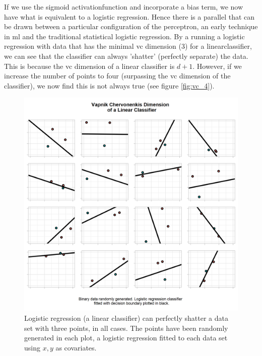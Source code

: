 If we use the sigmoid \gls{activationfunction} and incorporate a bias term, we now have what is equivalent to a logistic regression. Hence there is a parallel that can be drawn between a particular configuration of the perceptron, an early technique in \gls{ml} and the traditional statistical logistic regression. By a running a logistic regression with data that has the minimal \gls{vc} dimension (3) for a \gls{linearclassifier}, we can see that the classifier can always 'shatter' (perfectly separate) the data. This is because the \gls{vc} dimension of a linear classifier is $d+1$. However, if we increase the number of points to four (surpassing the \gls{vc} dimension of the classifier), we now find this is not always true (see figure \ref{fig:vc_4}).

\begin{figure}[H]
    \centering
    \includegraphics[width=120mm]{figs/vc_3.png}
    \caption[\gls{vc} dimension of a linear classifier - the data is shattered.]{Logistic regression (a linear classifier) can perfectly shatter a data set with three points, in all cases. The points have been randomly generated in each plot, a logistic regression fitted to each data set using $x, y$ as covariates.}
    \label{fig:vc_3}
\end{figure}

